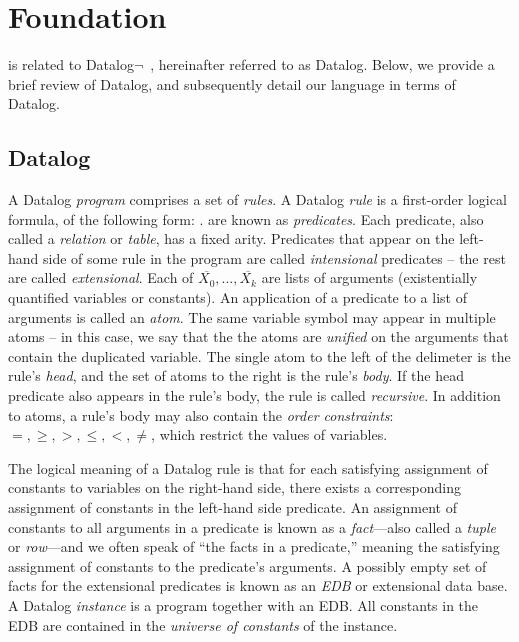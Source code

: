 \section{Foundation}
\label{sec:lang}

\lang is related to Datalog$\lnot$~\cite{ullmanbook}, hereinafter referred to
as Datalog.
Below, we provide a brief review of Datalog, and subsequently detail our
language in terms of Datalog.

\subsection{Datalog}
\label{sec:datalog}

A Datalog {\em program} comprises a set of {\em rules}.  A Datalog {\em rule}
is a first-order logical formula, of the following form:
.   are known as {\em
predicates}.  Each predicate, also called a {\em relation} or {\em table}, has
a fixed arity.  Predicates that appear on the left-hand side of some rule in
the program are called {\em intensional} predicates -- the rest are called {\em
extensional}.  Each of $\overline{X_0}, ..., \overline{X_k}$ are lists of
arguments (existentially quantified variables or constants).  An application of
a predicate to a list of arguments is called an {\em atom}.  The same variable
symbol may appear in multiple atoms -- in this case, we say that the the atoms
are {\em unified} on the arguments that contain the duplicated variable.  The
single atom to the left of the \dedalus{:-} delimeter is the rule's {\em head},
and the set of atoms to the right is the rule's {\em body}.  If the head
predicate also appears in the rule's body, the rule is called {\em recursive}.
In addition to atoms, a rule's body may also contain the {\em order
constraints}: $=, \geq, >, \leq, <, \neq$, which restrict the values of
variables.  

The logical meaning of a Datalog rule is that for each satisfying assignment of
constants to variables on the right-hand side, there exists
a corresponding
assignment of constants in the left-hand side predicate.  An assignment of
constants to all arguments in a predicate is known as a {\em fact}---also
called a {\em tuple} or {\em row}---and we often speak of ``the facts in a
predicate,'' meaning the satisfying assignment of constants to the predicate's
arguments.  A possibly empty set of facts for the extensional predicates is
known as an {\em EDB} or extensional data base.  A Datalog {\em instance} is a
program together with an EDB.  All constants in the EDB are contained in the
{\em universe of constants} of the instance.


